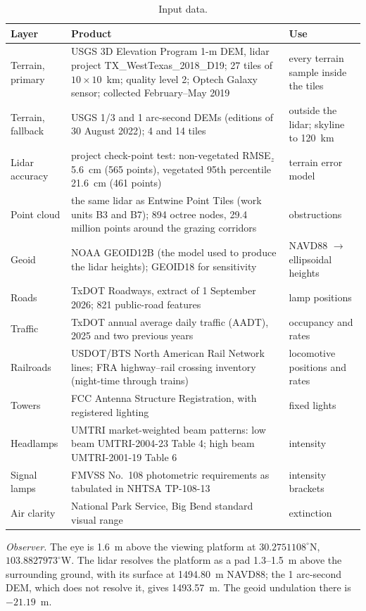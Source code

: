 \documentclass[11pt]{article}
\begin{document}
\begin{table}[htbp]
\caption{Input data.}
\label{t:data}
\small
\begin{tabularx}{\textwidth}{p{3.6cm}Xp{3.6cm}}
\toprule
Layer & Product & Use \\
\midrule
Terrain, primary & USGS 3D Elevation Program 1-m DEM, lidar project TX\_WestTexas\_2018\_D19; 27 tiles of $10\times10$~km; quality level 2; Optech Galaxy sensor; collected February--May 2019 & every terrain sample inside the tiles \\
Terrain, fallback & USGS 1/3 and 1 arc-second DEMs (editions of 30 August 2022); 4 and 14 tiles & outside the lidar; skyline to 120~km \\
Lidar accuracy & project check-point test: non-vegetated RMSE$_z$ 5.6~cm (565 points), vegetated 95th percentile 21.6~cm (461 points) & terrain error model \\
Point cloud & the same lidar as Entwine Point Tiles (work units B3 and B7); 894 octree nodes, 29.4 million points around the grazing corridors & obstructions \\
Geoid & NOAA GEOID12B (the model used to produce the lidar heights); GEOID18 for sensitivity & NAVD88 $\to$ ellipsoidal heights \\
Roads & TxDOT Roadways, extract of 1 September 2026; 821 public-road features & lamp positions \\
Traffic & TxDOT annual average daily traffic (AADT), 2025 and two previous years & occupancy and rates \\
Railroads & USDOT/BTS North American Rail Network lines; FRA highway--rail crossing inventory (night-time through trains) & locomotive positions and rates \\
Towers & FCC Antenna Structure Registration, with registered lighting & fixed lights \\
Headlamps & UMTRI market-weighted beam patterns: low beam UMTRI-2004-23 Table 4; high beam UMTRI-2001-19 Table 6 & intensity \\
Signal lamps & FMVSS No.~108 photometric requirements as tabulated in NHTSA TP-108-13 & intensity brackets \\
Air clarity & National Park Service, Big Bend standard visual range & extinction \\
\bottomrule
\end{tabularx}
\end{table}

\textit{Observer.} The eye is 1.6~m above the viewing platform at $30.2751108^\circ$N, $103.8827973^\circ$W. The lidar resolves the platform as a pad 1.3--1.5~m above the surrounding ground, with its surface at 1494.80~m NAVD88; the 1 arc-second DEM, which does not resolve it, gives 1493.57~m. The geoid undulation there is $-21.19$~m.
\end{document}
